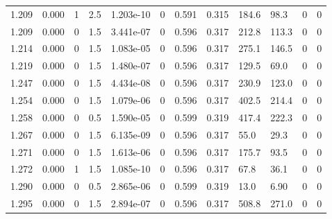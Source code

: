 \documentclass[preview]{standalone}
\begin{document}
{{{\begin{tabular}{L{1.2cm}C{1.2cm} C{0.3cm}C{0.5cm} C{1.4cm}C{1.4cm} C{1.4cm}C{1.4cm} C{1.6cm}C{1.6cm} C{1.6cm}C{1.6cm}}
  1.209  &  0.000  & 1     & 2.5 &  1.203e-10  & 0  &  0.591&   0.315& 184.6 & 98.3   &  0 & 0  \\ 
  1.209  &  0.000  & 0     & 1.5 &  3.441e-07  & 0  &  0.596&   0.317& 212.8 & 113.3   &  0 & 0  \\ 
  1.214  &  0.000  & 0     & 1.5 &  1.083e-05  & 0  &  0.596&   0.317& 275.1 & 146.5   &  0 & 0  \\ 
  1.219  &  0.000  & 0     & 1.5 &  1.480e-07  & 0  &  0.596&   0.317& 129.5 & 69.0   &  0 & 0  \\ 
  1.247  &  0.000  & 0     & 1.5 &  4.434e-08  & 0  &  0.596&   0.317& 230.9 & 123.0   &  0 & 0  \\ 
  1.254  &  0.000  & 0     & 1.5 &  1.079e-06  & 0  &  0.596&   0.317& 402.5 & 214.4   &  0 & 0  \\ 
  1.258  &  0.000  & 0     & 0.5 &  1.590e-05  & 0  &  0.599&   0.319& 417.4 & 222.3   &  0 & 0  \\ 
  1.267  &  0.000  & 0     & 1.5 &  6.135e-09  & 0  &  0.596&   0.317& 55.0 & 29.3   &  0 & 0  \\ 
  1.271  &  0.000  & 0     & 1.5 &  1.613e-06  & 0  &  0.596&   0.317& 175.7 & 93.5   &  0 & 0  \\ 
  1.272  &  0.000  & 1     & 1.5 &  1.085e-10  & 0  &  0.596&   0.317& 67.8 & 36.1   &  0 & 0  \\ 
  1.290  &  0.000  & 0     & 0.5 &  2.865e-06  & 0  &  0.599&   0.319& 13.0 & 6.90   &  0 & 0  \\ 
  1.295  &  0.000  & 0     & 1.5 &  2.894e-07  & 0  &  0.596&   0.317& 508.8 & 271.0   &  0 & 0  \\ 
\hline 
\end{tabular} 

}}}
\end{document}
